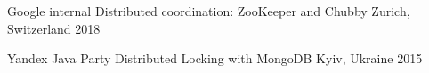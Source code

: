 

\begin{cventries}

  \cventry
    {Google internal} %
    {Distributed coordination: ZooKeeper and Chubby} %
    {Zurich, Switzerland} %
    {2018} %
    {}

  \cventry
    {Yandex Java Party} %
    {Distributed Locking with MongoDB} %
    {Kyiv, Ukraine} %
    {2015} %
    {}

\end{cventries}
